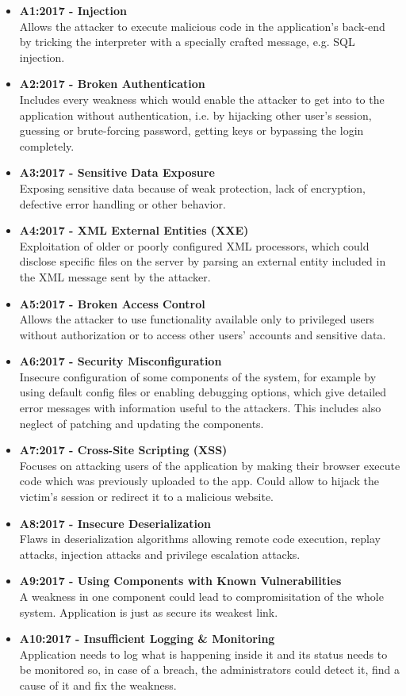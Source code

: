 \documentclass[a4paper]{article}
\begin{document}
\begin{itemize}
	\item \textbf{A1:2017 - Injection} \\
		Allows the attacker to execute malicious code in the
		application's back-end by tricking the interpreter with a
		specially crafted message, e.g. SQL injection.
	\item \textbf{A2:2017 - Broken Authentication} \\
		Includes every weakness which would enable the attacker to get
		into to the application without authentication, i.e. by 
		hijacking other user's session, guessing or brute-forcing
		password, getting keys or bypassing the login completely.
	\item \textbf{A3:2017 - Sensitive Data Exposure} \\
		Exposing sensitive data because of weak protection, lack of
		encryption, defective error handling or other behavior.
	\item \textbf{A4:2017 - XML External Entities (XXE)} \\
		Exploitation of older or poorly configured XML processors, which
		could disclose specific files on the server by parsing an
		external entity included in the XML message sent by the
		attacker.
	\item \textbf{A5:2017 - Broken Access Control} \\
		Allows the attacker to use functionality available only to
		privileged users without authorization or to access other users'
		accounts and sensitive data.
	\item \textbf{A6:2017 - Security Misconfiguration} \\
		Insecure configuration of some components of the system, for
		example by using default config files or enabling debugging
		options, which give detailed error messages with information
		useful to the attackers. This includes also neglect of patching
		and updating the components.
	\item \textbf{A7:2017 - Cross-Site Scripting (XSS)} \\
		Focuses on attacking users of the application by making their
		browser execute code which was previously uploaded to the
		app. Could allow to hijack the victim's session or redirect it
		to a malicious website. 
	\item \textbf{A8:2017 - Insecure Deserialization} \\
		Flaws in deserialization algorithms allowing remote code
		execution, replay attacks, injection attacks and privilege
		escalation attacks.
	\item \textbf{A9:2017 - Using Components with Known Vulnerabilities} \\
		A weakness in one component could lead to compromisitation of
		the whole system. Application is just as secure its weakest
		link.
	\item \textbf{A10:2017 - Insufficient Logging \& Monitoring} \\
		Application needs to log what is happening inside it and its
		status needs to be monitored so, in case of a breach,
		the administrators could detect it, find a cause of it and fix
		the weakness.
\end{itemize}
\end{document}
